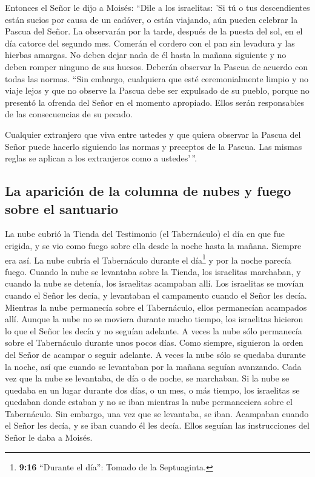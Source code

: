  Entonces el Señor le dijo a Moisés: 
``Dile a los israelitas: 'Si tú o tus descendientes están sucios por
causa de un cadáver, o están viajando, aún pueden celebrar la Pascua del
Señor.  La observarán por la tarde, después de la puesta
del sol, en el día catorce del segundo mes. Comerán el cordero con el
pan sin levadura y las hierbas amargas.  No deben dejar
nada de él hasta la mañana siguiente y no deben romper ninguno de sus
huesos. Deberán observar la Pascua de acuerdo con todas las normas.
 ``Sin embargo, cualquiera que esté ceremonialmente
limpio y no viaje lejos y que no observe la Pascua debe ser expulsado de
su pueblo, porque no presentó la ofrenda del Señor en el momento
apropiado. Ellos serán responsables de las consecuencias de su pecado.

 Cualquier extranjero que viva entre ustedes y que quiera
observar la Pascua del Señor puede hacerlo siguiendo las normas y
preceptos de la Pascua. Las mismas reglas se aplican a los extranjeros
como a ustedes'\,''.

\hypertarget{la-apariciuxf3n-de-la-columna-de-nubes-y-fuego-sobre-el-santuario}{%
\subsection{La aparición de la columna de nubes y fuego sobre el
santuario}\label{la-apariciuxf3n-de-la-columna-de-nubes-y-fuego-sobre-el-santuario}}

 La nube cubrió la Tienda del Testimonio (el Tabernáculo)
el día en que fue erigida, y se vio como fuego sobre ella desde la noche
hasta la mañana.  Siempre era así. La nube cubría el
Tabernáculo durante el día\footnote{\textbf{9:16} ``Durante el día'':
  Tomado de la Septuaginta.} y por la noche parecía fuego.
 Cuando la nube se levantaba sobre la Tienda, los
israelitas marchaban, y cuando la nube se detenía, los israelitas
acampaban allí.  Los israelitas se movían cuando el Señor
les decía, y levantaban el campamento cuando el Señor les decía.
Mientras la nube permanecía sobre el Tabernáculo, ellos permanecían
acampados allí.  Aunque la nube no se moviera durante
mucho tiempo, los israelitas hicieron lo que el Señor les decía y no
seguían adelante.  A veces la nube sólo permanecía sobre
el Tabernáculo durante unos pocos días. Como siempre, siguieron la orden
del Señor de acampar o seguir adelante.  A veces la nube
sólo se quedaba durante la noche, así que cuando se levantaban por la
mañana seguían avanzando. Cada vez que la nube se levantaba, de día o de
noche, se marchaban.  Si la nube se quedaba en un lugar
durante dos días, o un mes, o más tiempo, los israelitas se quedaban
donde estaban y no se iban mientras la nube permaneciera sobre el
Tabernáculo. Sin embargo, una vez que se levantaba, se iban.
 Acampaban cuando el Señor les decía, y se iban cuando él
les decía. Ellos seguían las instrucciones del Señor le daba a Moisés.

